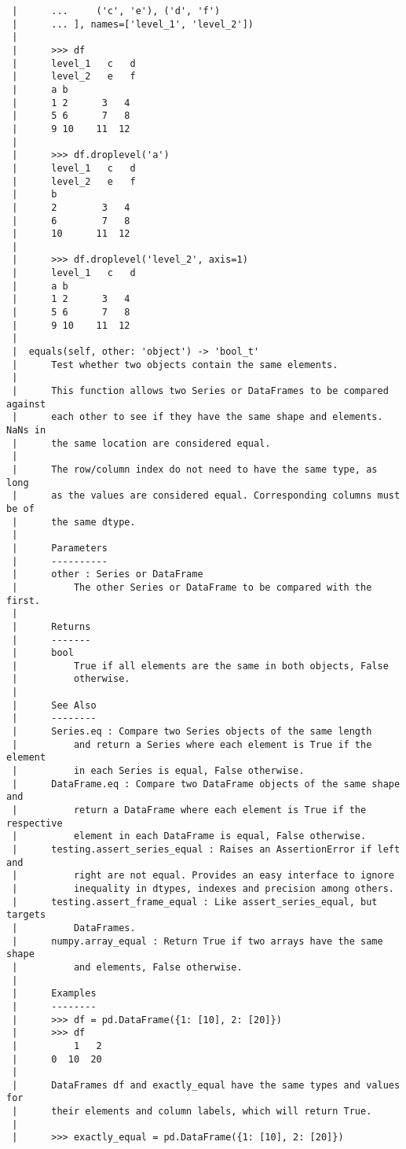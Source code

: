\documentclass[
  letterpaper,
  DIV=11,
  numbers=noendperiod]{scrreprt}
\begin{document}
\begin{verbatim}
 |      ...     ('c', 'e'), ('d', 'f')
 |      ... ], names=['level_1', 'level_2'])
 |      
 |      >>> df
 |      level_1   c   d
 |      level_2   e   f
 |      a b
 |      1 2      3   4
 |      5 6      7   8
 |      9 10    11  12
 |      
 |      >>> df.droplevel('a')
 |      level_1   c   d
 |      level_2   e   f
 |      b
 |      2        3   4
 |      6        7   8
 |      10      11  12
 |      
 |      >>> df.droplevel('level_2', axis=1)
 |      level_1   c   d
 |      a b
 |      1 2      3   4
 |      5 6      7   8
 |      9 10    11  12
 |  
 |  equals(self, other: 'object') -> 'bool_t'
 |      Test whether two objects contain the same elements.
 |      
 |      This function allows two Series or DataFrames to be compared against
 |      each other to see if they have the same shape and elements. NaNs in
 |      the same location are considered equal.
 |      
 |      The row/column index do not need to have the same type, as long
 |      as the values are considered equal. Corresponding columns must be of
 |      the same dtype.
 |      
 |      Parameters
 |      ----------
 |      other : Series or DataFrame
 |          The other Series or DataFrame to be compared with the first.
 |      
 |      Returns
 |      -------
 |      bool
 |          True if all elements are the same in both objects, False
 |          otherwise.
 |      
 |      See Also
 |      --------
 |      Series.eq : Compare two Series objects of the same length
 |          and return a Series where each element is True if the element
 |          in each Series is equal, False otherwise.
 |      DataFrame.eq : Compare two DataFrame objects of the same shape and
 |          return a DataFrame where each element is True if the respective
 |          element in each DataFrame is equal, False otherwise.
 |      testing.assert_series_equal : Raises an AssertionError if left and
 |          right are not equal. Provides an easy interface to ignore
 |          inequality in dtypes, indexes and precision among others.
 |      testing.assert_frame_equal : Like assert_series_equal, but targets
 |          DataFrames.
 |      numpy.array_equal : Return True if two arrays have the same shape
 |          and elements, False otherwise.
 |      
 |      Examples
 |      --------
 |      >>> df = pd.DataFrame({1: [10], 2: [20]})
 |      >>> df
 |          1   2
 |      0  10  20
 |      
 |      DataFrames df and exactly_equal have the same types and values for
 |      their elements and column labels, which will return True.
 |      
 |      >>> exactly_equal = pd.DataFrame({1: [10], 2: [20]})

\end{verbatim}
\end{document}
